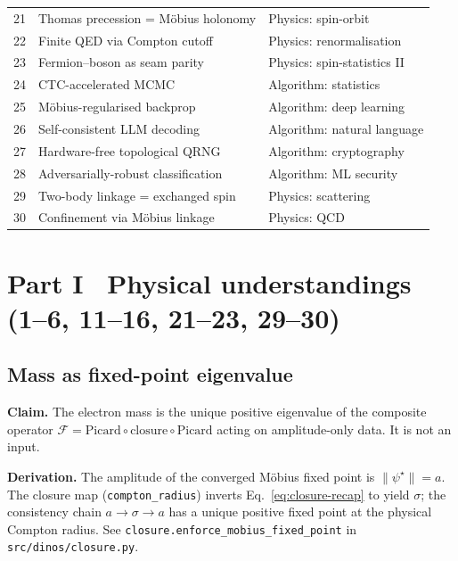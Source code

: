 \documentclass[11pt,a4paper]{article}
\theoremstyle{definition}
\begin{document}
\begin{small}
\begin{longtable}{@{}rp{}p{}@{}}
21 & Thomas precession = M\"obius holonomy & Physics: spin-orbit \\
22 & Finite QED via Compton cutoff & Physics: renormalisation \\
23 & Fermion--boson as seam parity & Physics: spin-statistics II \\
24 & CTC-accelerated MCMC & Algorithm: statistics \\
25 & M\"obius-regularised backprop & Algorithm: deep learning \\
26 & Self-consistent LLM decoding & Algorithm: natural language \\
27 & Hardware-free topological QRNG & Algorithm: cryptography \\
28 & Adversarially-robust classification & Algorithm: ML security \\
29 & Two-body linkage = exchanged spin & Physics: scattering \\
30 & Confinement via M\"obius linkage & Physics: QCD \\
\bottomrule
\end{longtable}
\end{small}

\section{Part I \textemdash\ Physical understandings (1--6, 11--16, 21--23, 29--30)}
\label{sec:physics}

\subsection{Mass as fixed-point eigenvalue}\label{nov:1}

\begin{tcolorbox}[noveltybox]
\textbf{Claim.} The electron mass is the unique positive eigenvalue of
the composite operator
$\mathcal{F} = \text{Picard} \circ \text{closure} \circ \text{Picard}$
acting on amplitude-only data. It is not an input.
\end{tcolorbox}

\textbf{Derivation.} The amplitude of the converged M\"obius fixed
point is $\|\psi^\star\| = a$. The closure map
(\texttt{compton\_radius}) inverts Eq.~\eqref{eq:closure-recap} to yield
$\sigma$; the consistency chain $a \to \sigma \to a$ has a unique
positive fixed point at the physical Compton radius. See
\texttt{closure.enforce\_mobius\_fixed\_point} in
\texttt{src/dinos/closure.py}.
\end{document}
